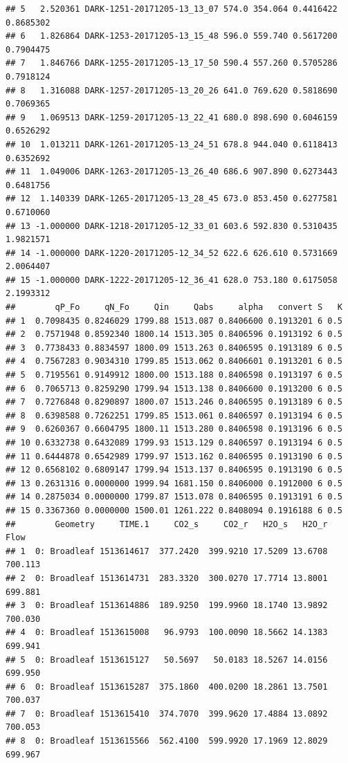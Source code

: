 \documentclass[]{krantz}
\theoremstyle{definition}
\theoremstyle{definition}
\theoremstyle{definition}
\theoremstyle{remark}
\begin{document}
\begin{verbatim}
## 5   2.520361 DARK-1251-20171205-13_13_07 574.0 354.064 0.4416422 0.8685302
## 6   1.826864 DARK-1253-20171205-13_15_48 596.0 559.740 0.5617200 0.7904475
## 7   1.846766 DARK-1255-20171205-13_17_50 590.4 557.260 0.5705286 0.7918124
## 8   1.316088 DARK-1257-20171205-13_20_26 641.0 769.620 0.5818690 0.7069365
## 9   1.069513 DARK-1259-20171205-13_22_41 680.0 898.690 0.6046159 0.6526292
## 10  1.013211 DARK-1261-20171205-13_24_51 678.8 944.040 0.6118413 0.6352692
## 11  1.049006 DARK-1263-20171205-13_26_40 686.6 907.890 0.6273443 0.6481756
## 12  1.140339 DARK-1265-20171205-13_28_45 673.0 853.450 0.6277581 0.6710060
## 13 -1.000000 DARK-1218-20171205-12_33_01 603.6 592.830 0.5310435 1.9821571
## 14 -1.000000 DARK-1220-20171205-12_34_52 622.6 626.610 0.5731669 2.0064407
## 15 -1.000000 DARK-1222-20171205-12_36_41 628.0 753.180 0.6175058 2.1993312
##        qP_Fo     qN_Fo     Qin     Qabs     alpha   convert S   K
## 1  0.7098435 0.8246029 1799.88 1513.087 0.8406600 0.1913201 6 0.5
## 2  0.7571948 0.8592340 1800.14 1513.305 0.8406596 0.1913192 6 0.5
## 3  0.7738433 0.8834597 1800.09 1513.263 0.8406595 0.1913189 6 0.5
## 4  0.7567283 0.9034310 1799.85 1513.062 0.8406601 0.1913201 6 0.5
## 5  0.7195561 0.9149912 1800.00 1513.188 0.8406598 0.1913197 6 0.5
## 6  0.7065713 0.8259290 1799.94 1513.138 0.8406600 0.1913200 6 0.5
## 7  0.7276848 0.8290897 1800.07 1513.246 0.8406595 0.1913189 6 0.5
## 8  0.6398588 0.7262251 1799.85 1513.061 0.8406597 0.1913194 6 0.5
## 9  0.6260367 0.6604795 1800.11 1513.280 0.8406598 0.1913196 6 0.5
## 10 0.6332738 0.6432089 1799.93 1513.129 0.8406597 0.1913194 6 0.5
## 11 0.6444878 0.6542989 1799.97 1513.162 0.8406595 0.1913190 6 0.5
## 12 0.6568102 0.6809147 1799.94 1513.137 0.8406595 0.1913190 6 0.5
## 13 0.2631316 0.0000000 1999.94 1681.150 0.8406000 0.1912000 6 0.5
## 14 0.2875034 0.0000000 1799.87 1513.078 0.8406595 0.1913191 6 0.5
## 15 0.3367360 0.0000000 1500.01 1261.222 0.8408094 0.1916188 6 0.5
##        Geometry     TIME.1     CO2_s     CO2_r   H2O_s   H2O_r    Flow
## 1  0: Broadleaf 1513614617  377.2420  399.9210 17.5209 13.6708 700.113
## 2  0: Broadleaf 1513614731  283.3320  300.0270 17.7714 13.8001 699.881
## 3  0: Broadleaf 1513614886  189.9250  199.9960 18.1740 13.9892 700.030
## 4  0: Broadleaf 1513615008   96.9793  100.0090 18.5662 14.1383 699.941
## 5  0: Broadleaf 1513615127   50.5697   50.0183 18.5267 14.0156 699.950
## 6  0: Broadleaf 1513615287  375.1860  400.0200 18.2861 13.7501 700.037
## 7  0: Broadleaf 1513615410  374.7070  399.9620 17.4884 13.0892 700.053
## 8  0: Broadleaf 1513615566  562.4100  599.9920 17.1969 12.8029 699.967

\end{verbatim}
\end{document}
